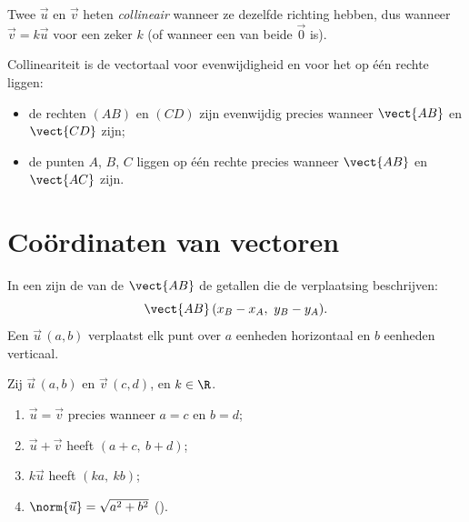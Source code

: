 \begin{definition}[Collineariteit]\label{def:g10:vectors:collinear}
Twee  $\vec u$ en $\vec v$ heten
\emph{collineair} wanneer ze dezelfde richting
hebben, dus wanneer $\vec v = k \vec u$ voor een zeker  $k$ (of
wanneer een van beide $\vec 0$ is).
\end{definition}

\begin{remark}
Collineariteit is de vectortaal voor evenwijdigheid en voor het op één rechte
liggen:
\begin{itemize}
  \item de rechten $(AB)$ en $(CD)$ zijn evenwijdig precies wanneer
        $\vect{AB}$ en $\vect{CD}$  zijn;
  \item de punten $A$, $B$, $C$ liggen op één rechte precies wanneer
        $\vect{AB}$ en $\vect{AC}$  zijn.
\end{itemize}
\end{remark}

\section{Coördinaten van vectoren}

\begin{definition}\label{def:g10:vectors:coords}
In een  zijn de \emph{} van de  $\vect{AB}$ de
getallen die de verplaatsing beschrijven:
\[
\vect{AB}\,(x_B - x_A,\ y_B - y_A).
\]
Een  $\vec u\,(a, b)$ verplaatst elk punt over $a$ eenheden horizontaal
en $b$ eenheden verticaal.
\end{definition}

\begin{proposition}\label{prop:g10:vectors:coordrules}
Zij $\vec u\,(a, b)$ en $\vec v\,(c, d)$, en $k \in \R$.
\begin{enumerate}
  \item $\vec u = \vec v$ precies wanneer $a = c$ en $b = d$;
  \item $\vec u + \vec v$ heeft  $(a + c,\ b + d)$;
  \item $k\vec u$ heeft  $(ka,\ kb)$;
  \item $\norm{\vec u} = \sqrt{a^2 + b^2}$ ().
\end{enumerate}
\end{proposition}

